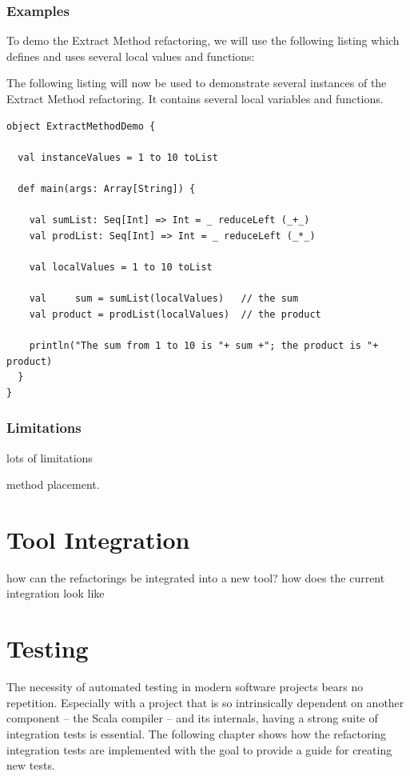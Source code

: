\documentclass[10pt,a4paper,oneside]{scrreprt}
\begin{document}
\subsection{Examples}

To demo the Extract Method refactoring, we will use the following listing which defines and uses several local values and functions:

The following listing will now be used to demonstrate several instances of the Extract Method refactoring. It contains several local variables and functions.

\begin{lstlisting}
object ExtractMethodDemo {
  
  val instanceValues = 1 to 10 toList

  def main(args: Array[String]) {
    
    val sumList: Seq[Int] => Int = _ reduceLeft (_+_)
    val prodList: Seq[Int] => Int = _ reduceLeft (_*_)
    
    val localValues = 1 to 10 toList
    
    val     sum = sumList(localValues)   // the sum
    val product = prodList(localValues)  // the product

    println("The sum from 1 to 10 is "+ sum +"; the product is "+ product)
  }
}
\end{lstlisting}



\subsection{Limitations}

lots of limitations

method placement.

\chapter{Tool Integration} \label{chapter:tool-integration}

how can the refactorings be integrated into a new tool?
how does the current integration look like

\chapter{Testing} \label{chapter:testing}

The necessity of automated testing in modern software projects bears no repetition. Especially with a project that is so intrinsically dependent on another component -- the Scala compiler -- and its internals, having a strong suite of integration tests is essential. The following chapter shows how the refactoring integration tests are implemented with the goal to provide a guide for creating new tests.
\end{document}
